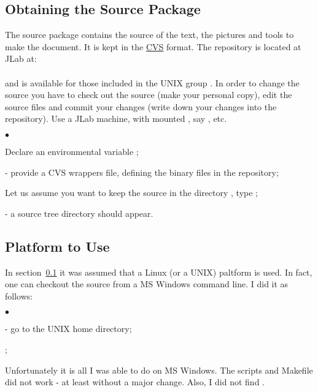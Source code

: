 \documentclass[12pt,letterpaper]{article}
\begin{document}
\subsection{Obtaining the Source Package}
\label{sec:obtain}

 The source package contains the source of the text, 
 the pictures and tools to make the document.
 It is kept in the \href{http://www.cvshome.org/}{CVS}\cite{CVSwww} format.
 The repository is located at JLab at: \\
  \\
 and is available for those included in the UNIX group .
 In order to change the source you have to check out the source
 (make your personal copy), edit the source files and commit
 your changes (write down your changes into the repository). Use
 a JLab machine, with mounted , say ,  etc.
  \begin{list}{$\bullet$}{\setlength{\itemsep}{-0.15cm}}
    \item Declare an environmental variable ;
    \item {} - provide a CVS wrappers file,
           defining the binary files in the repository;
    \item Let us assume you want to keep the source in the directory ,
          type ;
    \item {} - a source tree directory 
          should appear. 
  \end{list}
 
   
\subsection{Platform to Use}
\label{sec:platform}   

  In section~\ref{sec:obtain} it was assumed that a Linux (or a UNIX) paltform
  is used. In fact, one can checkout the source from a MS Windows command line.
  I did it as follows:
  \begin{list}{$\bullet$}{\setlength{\itemsep}{-0.15cm}}
    \item {} - go to the UNIX home directory;
    \item {};
  \end{list}
  Unfortunately it is all I was able to do on MS Windows.
  The scripts and Makefile did not work - at least without
  a major change. Also, I did not find .
\end{document}

